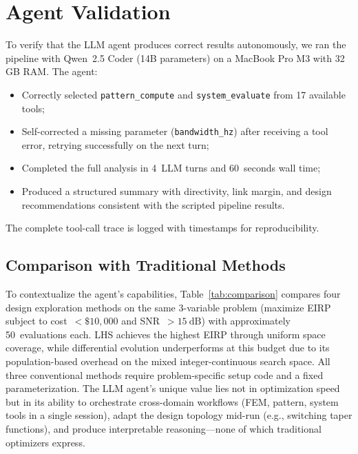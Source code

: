 \documentclass[journal]{IEEEtran}
\begin{document}
\section{Agent Validation}

To verify that the LLM agent produces correct results autonomously, we
ran the pipeline with Qwen~2.5 Coder (14B parameters) on a MacBook Pro
M3 with 32\,GB RAM. The agent:
\begin{itemize}
\item Correctly selected \texttt{pattern\_compute} and
  \texttt{system\_evaluate} from 17 available tools;
\item Self-corrected a missing parameter (\texttt{bandwidth\_hz}) after
  receiving a tool error, retrying successfully on the next turn;
\item Completed the full analysis in 4~LLM turns and 60~seconds wall
  time;
\item Produced a structured summary with directivity, link margin, and
  design recommendations consistent with the scripted pipeline results.
\end{itemize}

The complete tool-call trace is logged with timestamps for
reproducibility.

\subsection{Comparison with Traditional Methods}

To contextualize the agent's capabilities, Table~\ref{tab:comparison}
compares four design exploration methods on the same 3-variable problem
(maximize EIRP subject to cost~$< \$10{,}000$ and SNR~$> \SI{15}{\deci\bel}$)
with approximately 50~evaluations each. LHS achieves the highest EIRP
through uniform space coverage, while differential evolution
underperforms at this budget due to its population-based overhead on
the mixed integer-continuous search space. All three conventional
methods require problem-specific setup code and a fixed parameterization.
The LLM agent's unique value lies not in optimization speed but in its
ability to orchestrate cross-domain workflows (FEM, pattern, system
tools in a single session), adapt the design topology mid-run (e.g.,
switching taper functions), and produce interpretable reasoning---none
of which traditional optimizers express.
\end{document}
